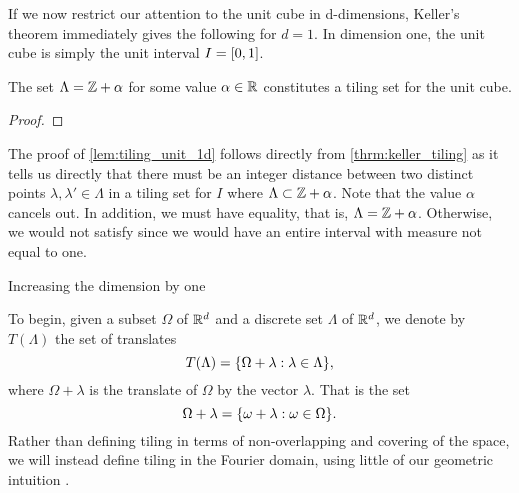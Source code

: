 \documentclass[../thesis.tex]{subfiles}
\begin{document}




If we now restrict our attention to the unit cube in d-dimensions, Keller's theorem immediately gives the following for $d=1$. In dimension one, the unit cube is simply the unit interval $I = [0,1]$. 

\begin{lemma}\label{lem:tiling_unit_1d}
    The set $\Lambda = \mathbb{Z} +\alpha$ for some value $\alpha\in \mathbb{R}$ constitutes a tiling set for the unit cube.
\end{lemma}

\begin{proof}  %
    

\end{proof}

The proof of \cref{lem:tiling_unit_1d} follows directly from \cref{thrm:keller_tiling} as it tells us directly that there must be an integer distance between two distinct points $\lambda,\lambda' \in \Lambda$ in a tiling set for $I$ where $\Lambda \subset \mathbb{Z} +\alpha$. Note that the value $\alpha$ cancels out. In addition, we must have equality, that is, $\Lambda = \mathbb{Z} +\alpha$. Otherwise, we would not satisfy  since we would have an entire interval with measure not equal to one.

Increasing the dimension by one 









To begin, given a subset $\Omega$ of $\mathbb{R}^d$ and a discrete set $\Lambda$ of $\mathbb{R}^d$, we denote by $T(\Lambda)$ the set of translates 
\begin{equation*}
    T(\Lambda) = \{\Omega+\lambda : \lambda\in \Lambda\},
\end{equation*}
where $\Omega + \lambda$ is the translate of $\Omega$ by the vector $\lambda$. That is the set
\begin{equation*}
    \Omega + \lambda = \{\omega + \lambda : \omega \in \Omega\}.
\end{equation*}
Rather than defining tiling in terms of non-overlapping and covering of the space, we will instead define tiling in the Fourier domain, using little of our geometric intuition \cite{kolountzakisTilingsTranslation2010} \cite{kolountzakisStudyTranslationalTiling2003}. 
\end{document}
